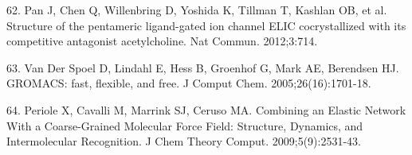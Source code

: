 62. Pan J, Chen Q, Willenbring D, Yoshida K, Tillman T, Kashlan OB, et
al. Structure of the pentameric ligand-gated ion channel ELIC
cocrystallized with its competitive antagonist acetylcholine. Nat
Commun. 2012;3:714.

63. Van Der Spoel D, Lindahl E, Hess B, Groenhof G, Mark AE, Berendsen
HJ. GROMACS: fast, flexible, and free. J Comput Chem.
2005;26(16):1701-18.

64. Periole X, Cavalli M, Marrink SJ, Ceruso MA. Combining an Elastic
Network With a Coarse-Grained Molecular Force Field: Structure,
Dynamics, and Intermolecular Recognition. J Chem Theory Comput.
2009;5(9):2531-43.

%
